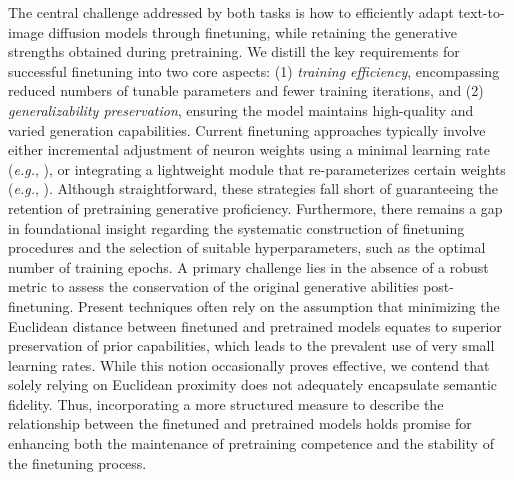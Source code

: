 The central challenge addressed by both tasks is how to efficiently adapt text-to-image diffusion models through finetuning, while retaining the generative strengths obtained during pretraining. We distill the key requirements for successful finetuning into two core aspects: (1) \emph{training efficiency}, encompassing reduced numbers of tunable parameters and fewer training iterations, and (2) \emph{generalizability preservation}, ensuring the model maintains high-quality and varied generation capabilities. Current finetuning approaches typically involve either incremental adjustment of neuron weights using a minimal learning rate (\emph{e.g.}, \cite{ruiz2023dreambooth}), or integrating a lightweight module that re-parameterizes certain weights (\emph{e.g.}, \cite{hulora2022,zhang2023adding}). Although straightforward, these strategies fall short of guaranteeing the retention of pretraining generative proficiency. Furthermore, there remains a gap in foundational insight regarding the systematic construction of finetuning procedures and the selection of suitable hyperparameters, such as the optimal number of training epochs. A primary challenge lies in the absence of a robust metric to assess the conservation of the original generative abilities post-finetuning. Present techniques often rely on the assumption that minimizing the Euclidean distance between finetuned and pretrained models equates to superior preservation of prior capabilities, which leads to the prevalent use of very small learning rates. While this notion occasionally proves effective, we contend that solely relying on Euclidean proximity does not adequately encapsulate semantic fidelity. Thus, incorporating a more structured measure to describe the relationship between the finetuned and pretrained models holds promise for enhancing both the maintenance of pretraining competence and the stability of the finetuning process.

